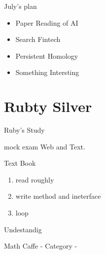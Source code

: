 \documentclass[12pt, unicode]{beamer}
\begin{document}
\begin{frame}{July's plan}
\begin{itemize}
  \item Paper Reading of AI
  \item Search Fintech
  \item Persistent Homology
  \item Something Intersting
\end{itemize}
\end{frame}


\section{Rubty Silver}
\begin{frame}{Ruby's Study}
  \begin{block}{mock exam}
    Web and Text.
  \end{block}
  \begin{block}{Text Book}
     \begin{enumerate}
       \item read roughly
       \item write method and ineterface
       \item loop
     \end{enumerate}


\begin{frame}{Undestandig}

\end{frame}

  \end{block}

\end{frame}


\begin{frame}{Math Caffe - Category -}



\end{frame}
\end{document}
